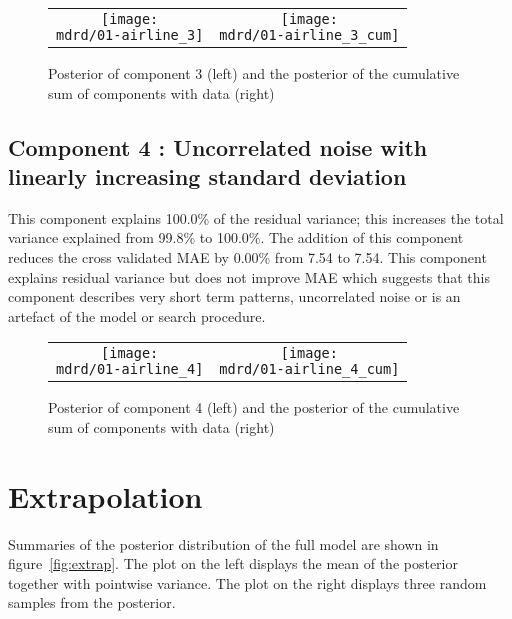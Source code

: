 \documentclass{article} %
\begin{document}
\begin{figure}[H]
\newcommand{\wmgd}{0.5\columnwidth}
\newcommand{\hmgd}{3.0cm}
\newcommand{\mdrd}{figures/01-airline}
\newcommand{\mbm}{\hspace{-0.3cm}}
\begin{tabular}{cc}
\mbm \texttt{[image: \\mdrd/01-airline\_3]} & \texttt{[image: \\mdrd/01-airline\_3\_cum]}
\end{tabular}
\caption{Posterior of component 3 (left) and the posterior of the cumulative sum of components with data (right)}
\label{fig:comp3}
\end{figure}

\subsection{Component 4 : Uncorrelated noise with linearly increasing standard deviation}



This component explains 100.0\% of the residual variance; this increases the total variance explained from 99.8\% to 100.0\%.
The addition of this component reduces the cross validated MAE by 0.00\% from 7.54 to 7.54.
This component explains residual variance but does not improve MAE which suggests that this component describes very short term patterns, uncorrelated noise or is an artefact of the model or search procedure.

\begin{figure}[H]
\newcommand{\wmgd}{0.5\columnwidth}
\newcommand{\hmgd}{3.0cm}
\newcommand{\mdrd}{figures/01-airline}
\newcommand{\mbm}{\hspace{-0.3cm}}
\begin{tabular}{cc}
\mbm \texttt{[image: \\mdrd/01-airline\_4]} & \texttt{[image: \\mdrd/01-airline\_4\_cum]}
\end{tabular}
\caption{Posterior of component 4 (left) and the posterior of the cumulative sum of components with data (right)}
\label{fig:comp4}
\end{figure}

\section{Extrapolation}

Summaries of the posterior distribution of the full model are shown in figure~\ref{fig:extrap}.
The plot on the left displays the mean of the posterior together with pointwise variance.
The plot on the right displays three random samples from the posterior.
\end{document}
